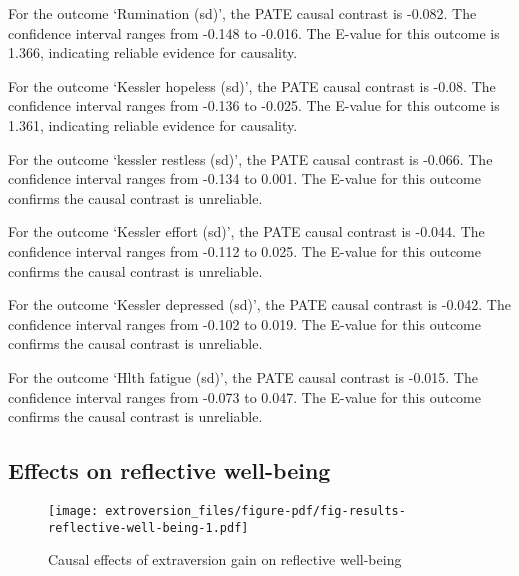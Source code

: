 \documentclass[
  singlecolumn]{report}
\begin{document}
For the outcome `Rumination (sd)', the PATE causal contrast is -0.082.
The confidence interval ranges from -0.148 to -0.016. The E-value for
this outcome is 1.366, indicating reliable evidence for causality.

For the outcome `Kessler hopeless (sd)', the PATE causal contrast is
-0.08. The confidence interval ranges from -0.136 to -0.025. The E-value
for this outcome is 1.361, indicating reliable evidence for causality.

For the outcome `kessler restless (sd)', the PATE causal contrast is
-0.066. The confidence interval ranges from -0.134 to 0.001. The E-value
for this outcome confirms the causal contrast is unreliable.

For the outcome `Kessler effort (sd)', the PATE causal contrast is
-0.044. The confidence interval ranges from -0.112 to 0.025. The E-value
for this outcome confirms the causal contrast is unreliable.

For the outcome `Kessler depressed (sd)', the PATE causal contrast is
-0.042. The confidence interval ranges from -0.102 to 0.019. The E-value
for this outcome confirms the causal contrast is unreliable.

For the outcome `Hlth fatigue (sd)', the PATE causal contrast is -0.015.
The confidence interval ranges from -0.073 to 0.047. The E-value for
this outcome confirms the causal contrast is unreliable.

\hypertarget{effects-on-reflective-well-being}{%
\subsection{Effects on reflective
well-being}\label{effects-on-reflective-well-being}}

\begin{figure}

{\centering \texttt{[image: extroversion\_files/figure-pdf/fig-results-reflective-well-being-1.pdf]}

}

\caption{\label{fig-results-reflective-well-being}Causal effects of
extraversion gain on reflective well-being}

\end{figure}
\end{document}
